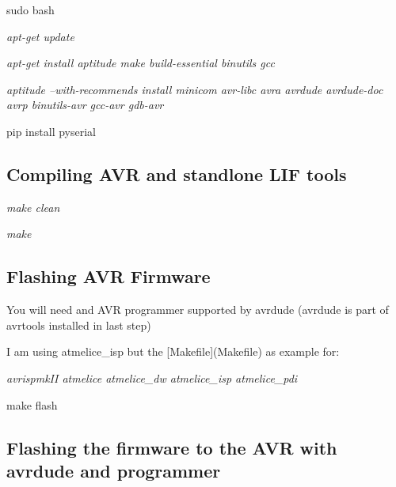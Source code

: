 \begin{DoxyItemize}
\item sudo bash
\item {\itshape apt-\/get update}
\item {\itshape apt-\/get install aptitude make build-\/essential binutils gcc}
\item {\itshape aptitude --with-\/recommends install minicom avr-\/libc avra avrdude avrdude-\/doc avrp binutils-\/avr gcc-\/avr gdb-\/avr}
\item pip install pyserial
\end{DoxyItemize}

\subsection*{Compiling A\+VR and standlone L\+IF tools}


\begin{DoxyItemize}
\item {\itshape make clean}
\item {\itshape make}
\end{DoxyItemize}

\subsection*{Flashing A\+VR Firmware}


\begin{DoxyItemize}
\item You will need and A\+VR programmer supported by avrdude (avrdude is part of avrtools installed in last step)
\begin{DoxyItemize}
\item I am using atmelice\+\_\+isp but the \mbox{[}Makefile\mbox{]}(Makefile) as example for\+:
\begin{DoxyItemize}
\item {\itshape avrispmk\+II atmelice atmelice\+\_\+dw atmelice\+\_\+isp atmelice\+\_\+pdi}
\end{DoxyItemize}
\end{DoxyItemize}
\item make flash
\end{DoxyItemize}

\subsection*{Flashing the firmware to the A\+VR with avrdude and programmer}


